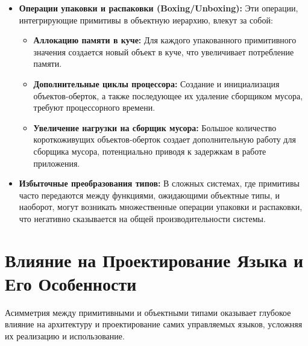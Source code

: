 \begin{itemize}[leftmargin=*,nosep]
    \item \textbf{Операции упаковки и распаковки (Boxing/Unboxing):} Эти операции, интегрирующие примитивы в объектную иерархию, влекут за собой:
    \begin{itemize}
        \item \textbf{Аллокацию памяти в куче:} Для каждого упакованного примитивного значения создается новый объект в куче, что увеличивает потребление памяти.
        \item \textbf{Дополнительные циклы процессора:} Создание и инициализация объектов-оберток, а также последующее их удаление сборщиком мусора, требуют процессорного времени.
        \item \textbf{Увеличение нагрузки на сборщик мусора:} Большое количество короткоживущих объектов-оберток создает дополнительную работу для сборщика мусора, потенциально приводя к задержкам в работе приложения.
    \end{itemize}

    \item \textbf{Избыточные преобразования типов:} В сложных системах, где примитивы часто передаются между функциями, ожидающими объектные типы, и наоборот, могут возникать множественные операции упаковки и распаковки, что негативно сказывается на общей производительности системы.
\end{itemize}

\section{Влияние на Проектирование Языка и Его Особенности}

Асимметрия между примитивными и объектными типами оказывает глубокое влияние на архитектуру и проектирование самих управляемых языков, усложняя их реализацию и использование.

